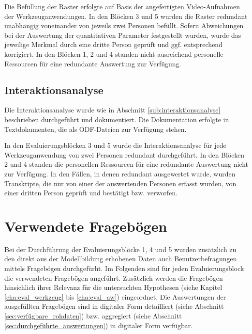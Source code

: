 Die Befüllung der Raster erfolgte auf Basis der angefertigten Video-Aufnahmen der Werkzeuganwendungen. In den Blöcken 3 und 5 wurden die Raster redundant unabhängig voneinander von jeweils zwei Personen befüllt. Sofern Abweichungen bei der Auswertung der quantitativen Parameter festgestellt wurden, wurde das jeweilige Merkmal durch eine dritte Person geprüft und ggf. entsprechend korrigiert. In den Blöcken 1, 2 und 4 standen nicht ausreichend personelle Ressourcen für eine redundante Auswertung zur Verfügung.

\subsection{Interaktionsanalyse}

Die Interaktionsanalyse wurde wie in Abschnitt \ref{sub:interaktionsanalyse} beschrieben durchgeführt und dokumentiert. Die Dokumentation erfolgte in Textdokumenten, die als \gls{ODF}-Dateien zur Verfügung stehen.

In den Evaluierungsblöcken 3 und 5 wurde die Interaktionsanalyse für jede Werkzeuganwendung von zwei Personen redundant durchgeführt. In den Blöcken 2 und 4 standen die personellen Ressourcen für eine redundante Auswertung nicht zur Verfügung. In den Fällen, in denen redundant ausgewertet wurde, wurden Transkripte, die nur von einer der auswertenden Personen erfasst wurden, von einer dritten Person geprüft und bestätigt bzw. verworfen.


\section{Verwendete Fragebögen} %
\label{sec:frageboegen}

Bei der Durchführung der Evaluierungsblöcke 1, 4 und 5 wurden zusätzlich zu den direkt aus der Modellbildung erhobenen Daten auch Benutzerbefragungen mittels Fragebögen durchgefürht. Im Folgenden sind für jeden Evaluierungsblock die verwendeten Fragebögen angeführt. Zusätzlich werden die Fragebögen hinsichlich ihrer Relevanz für die untersuchten Hypothesen (siehe Kapitel \ref{cha:eval_werkzeug} bis \ref{cha:eval_aw}) eingeordnet. Die Auswertungen der ausgefüllten Fragebögen sind in digitaler Form detailliert (siehe Abschnitt \ref{sec:verfügbare_rohdaten}) bzw. aggregiert (siehe Abschnitt \ref{sec:durchgeführte_auswertungen}) in digitaler Form verfügbar.



